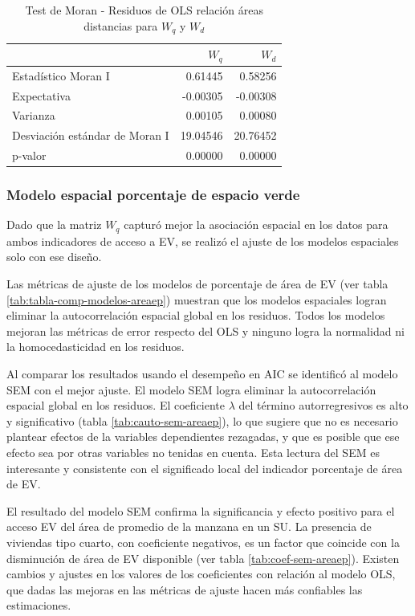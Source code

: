 \documentclass[12pt,a4paper,openany]{book}
\theoremstyle{definition}
\theoremstyle{definition}
\theoremstyle{definition}
\theoremstyle{remark}
\begin{document}
\begin{table}[t]

\caption{\label{tab:moran-resareadist-w}Test de Moran - Residuos de OLS relación áreas distancias para $W_q$ y $W_d$}
\centering
\begin{tabular}{lrr}
\toprule
  & $W_q$ & $W_d$\\
\midrule
Estadístico Moran I & 0.61445 & 0.58256\\
Expectativa & -0.00305 & -0.00308\\
Varianza & 0.00105 & 0.00080\\
Desviación estándar de Moran I & 19.04546 & 20.76452\\
p-valor & 0.00000 & 0.00000\\
\bottomrule
\end{tabular}
\end{table}

\subsubsection{Modelo espacial porcentaje de espacio
verde}\label{modelo-espacial-porcentaje-de-espacio-verde}

Dado que la matriz \(W_q\) capturó mejor la asociación espacial en los
datos para ambos indicadores de acceso a EV, se realizó el ajuste de los
modelos espaciales solo con ese diseño.

Las métricas de ajuste de los modelos de porcentaje de área de EV (ver
tabla \ref{tab:tabla-comp-modelos-areaep}) muestran que los modelos
espaciales logran eliminar la autocorrelación espacial global en los
residuos. Todos los modelos mejoran las métricas de error respecto del
OLS y ninguno logra la normalidad ni la homocedasticidad en los
residuos.

Al comparar los resultados usando el desempeño en AIC se identificó al
modelo SEM con el mejor ajuste. El modelo SEM logra eliminar la
autocorrelación espacial global en los residuos. El coeficiente
\(\lambda\) del término autorregresivos es alto y significativo (tabla
\ref{tab:cauto-sem-areaep}), lo que sugiere que no es necesario plantear
efectos de la variables dependientes rezagadas, y que es posible que ese
efecto sea por otras variables no tenidas en cuenta. Esta lectura del
SEM es interesante y consistente con el significado local del indicador
porcentaje de área de EV.

El resultado del modelo SEM confirma la significancia y efecto positivo
para el acceso EV del área de promedio de la manzana en un SU. La
presencia de viviendas tipo cuarto, con coeficiente negativos, es un
factor que coincide con la disminución de área de EV disponible (ver
tabla \ref{tab:coef-sem-areaep}). Existen cambios y ajustes en los
valores de los coeficientes con relación al modelo OLS, que dadas las
mejoras en las métricas de ajuste hacen más confiables las estimaciones.
\end{document}
